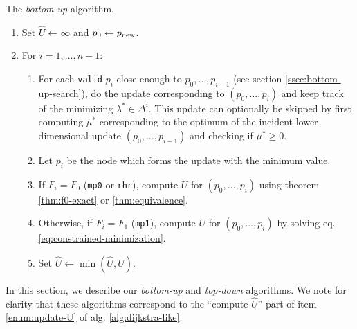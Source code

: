 \documentclass[smallcondensed]{svjour3}
\begin{document}
\begin{algorithm}[t]
  \caption{The \emph{bottom-up} algorithm.}\label{alg:bottom-up}
  \begin{enumerate}[nolistsep]
  \item Set $\hat{U} \gets \infty$ and $p_0 \gets p_{\operatorname{new}}$.
  \item For $i = 1, \hdots, n - 1$:
    \begin{enumerate}
    \item For each \texttt{valid} $p_i$ close enough to
      $p_0, \hdots, p_{i-1}$ (see section\@
      \ref{ssec:bottom-up-search}), do the update corresponding to
      $(p_0, \hdots, p_i)$ and keep track of the minimizing
      $\lambda^* \in \Delta^i$. This update can optionally be skipped
      by first computing $\mu^*$ corresponding to the optimum of the
      incident lower-dimensional update $(p_0, \hdots, p_{i-1})$ and
      checking if $\mu^* \geq 0$.\label{enum:bottom-up-for}
    \item Let $p_i$ be the node which forms the update with the
      minimum value.
    \item If $F_i = F_0$ (\texttt{mp0} or \texttt{rhr}), compute $U$
      for $(p_0, \hdots, p_{i})$ using theorem \ref{thm:f0-exact} or
      \ref{thm:equivalence}.
    \item Otherwise, if $F_i = F_1$ (\texttt{mp1}), compute $U$ for
      $(p_0, \hdots, p_{i})$ by solving eq.\@
      \ref{eq:constrained-minimization}.
    \item Set $\hat{U} \gets \min(\hat{U}, U)$.
    \end{enumerate}
  \end{enumerate}
\end{algorithm}

In this section, we describe our \emph{bottom-up} and \emph{top-down}
algorithms. We note for clarity that these algorithms correspond to
the ``compute $\hat{U}$'' part of item \ref{enum:update-U} of alg.\@
\ref{alg:dijkstra-like}.
\end{document}
